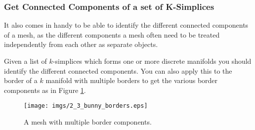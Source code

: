 \subsubsection{Get Connected Components of a set of K-Simplices}
It also comes in handy to be able to identify the different connected components of a mesh, as the different components a mesh often need to be treated independently from each other as separate objects.
	
Given a list of $k$-simplices which forms one or more discrete manifolds you should identify the different connected components. You can also apply this
to the border of a $k$ manifold with multiple borders to get the various border components as in Figure \ref{fig::2_3_bunnyBorder}.
	
\begin{figure}[t]
	\begin{center}
	\texttt{[image: imgs/2\_3\_bunny\_borders.eps]}
	\end{center}
	\caption{A mesh with multiple border components.}
	\label{fig::2_3_bunnyBorder}
\end{figure}

